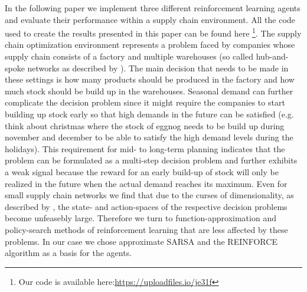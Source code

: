\documentclass[journal, a4paper]{IEEEtran}
\theoremstyle{plain}
\theoremstyle{definition}
\begin{document}
In the following paper we implement three different reinforcement learning agents and evaluate their performance within a supply chain environment. All the code used to create the results presented in this paper can be found here \footnote{Our code is available here:\url{https://uploadfiles.io/je31f}}. \newline
The supply chain optimization environment represents a problem faced by companies whose supply chain consists of a factory and multiple warehouses (so called hub-and-spoke networks as described by \cite{MFL}). The main decision that needs to be made in these settings is how many products should be produced in the factory and how much stock should be build up in the warehouses. Seasonal demand can further complicate the decision problem since it might require the companies to start building up stock early so that high demands in the future can be satisfied (e.g. think about christmas where the stock of eggnog needs to be build up during november and december to be able to satisfy the high demand levels during the holidays). This requirement for mid- to long-term planning indicates that the problem can be formulated as a multi-step decision problem and further exhibits a weak signal because the reward for an early build-up of stock will only be realized in the future when the actual demand reaches its maximum. \newline
Even for small supply chain networks we find that due to the curses of dimensionality, as described by \cite{PowellADP}, the state- and action-spaces of the respective decision problems become unfeasebly large. Therefore we turn to function-approximation and policy-search methods of reinforcement learning that are less affected by these problems. In our case we chose approximate SARSA and the REINFORCE algorithm as a basis for the agents.
\end{document}
